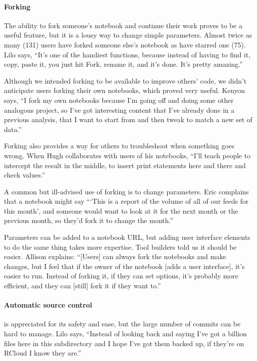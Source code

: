 \paragraph*{Forking} The ability to fork someone's notebook and continue their
work proves to be a useful feature, but it is a lousy way to change simple parameters.
Almost twice as many (131) users have forked
someone else's notebook as have starred one (75). Lilo says, ``It's one of the
handiest functions, because instead of having to find it, copy, paste it, you
just hit Fork, rename it, and it's done. It's pretty amazing.''

Although we intended forking to be available to improve others' code, we
didn't anticipate users forking their own notebooks, which
proved very useful. Kenyon says, ``I fork my own notebooks because I'm going off
and doing some other analogous project, so I've got interesting content that I've
already done in a previous analysis, that I want to start from and then tweak
to match a new set of data.''

Forking also provides a way for others to troubleshoot when something goes
wrong. When Hugh collaborates with users of his notebooks, ``I'll teach people
to intercept the result in the middle, to insert print statements here and
there and check values.''

A common but ill-advised use of forking is to change
parameters. Eric complains that a notebook might say ```This is a report of
the volume of all of our feeds for this month', and someone would want to
look at it for the next month or the previous month, so they'd fork it to
change the month.''

Parameters can be added to a notebook URL, but adding user interface
elements to do the same thing takes more expertise. Tool builders told us it
should be easier. Allison explains: ``[Users] can always fork the notebooks
and make changes, but I
feel that if the owner of the notebook [adds a user interface], it's easier to
run. Instead of forking it, if they can set options, it's probably more
efficient, and they can [still] fork it if they want to.''

\paragraph*{Automatic source control} is appreciated for its safety and ease,
but the large number of commits can be hard to manage. Lilo says, ``Instead of
looking back and saying I've got a billion files here in this subdirectory and I
hope I've got them backed up, if they're on RCloud I know they are.''

